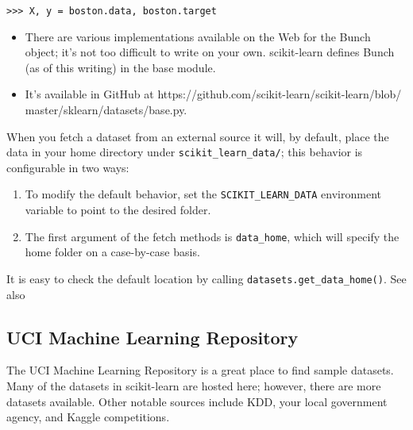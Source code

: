 \documentclass[SKL-MASTER.tex]{subfiles}
\begin{document}
\begin{framed}
\begin{verbatim}
>>> X, y = boston.data, boston.target
\end{verbatim}
\end{framed}
\begin{itemize}
\item There are various implementations available on the Web for the Bunch object; it's not too
difficult to write on your own. scikit-learn defines Bunch (as of this writing) in the base module.
\item It's available in GitHub at https://github.com/scikit-learn/scikit-learn/blob/
master/sklearn/datasets/base.py.
\end{itemize}


When you fetch a dataset from an external source it will, by default, place the data in your
home directory under \texttt{scikit\_learn\_data/}; this behavior is configurable in two ways:
\begin{enumerate}
\item To modify the default behavior, set the \texttt{SCIKIT\_LEARN\_DATA} environment variable
to point to the desired folder.
\item The first argument of the fetch methods is \texttt{data\_home}, which will specify the home
folder on a case-by-case basis.
\end{enumerate}
It is easy to check the default location by calling \texttt{datasets.get\_data\_home()}.
See also

\subsection*{UCI Machine Learning Repository}
The UCI Machine Learning Repository is a great place to find sample datasets. Many of the
datasets in scikit-learn are hosted here; however, there are more datasets available. Other
notable sources include KDD, your local government agency, and Kaggle competitions.
\end{document}

